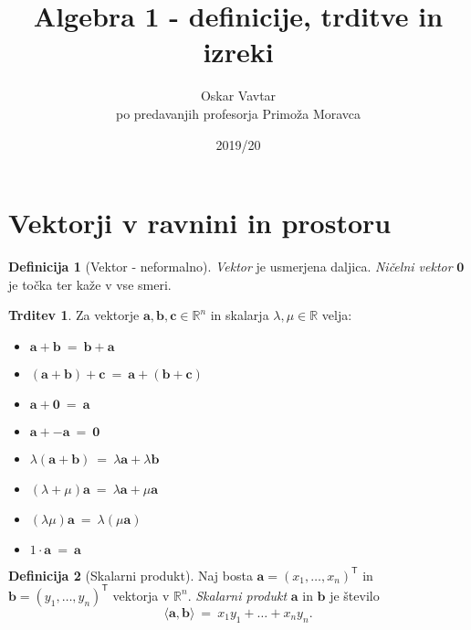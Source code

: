 \documentclass[11pt]{article}
\title{Algebra 1 - definicije, trditve in izreki}
\author{Oskar Vavtar \\
po predavanjih profesorja Primoža Moravca}
\date{2019/20}
\newcommand{\R}{\mathbb{R}}
\newcommand{\ls}{\langle}
\newcommand{\rs}{\rangle}
\renewcommand{\a}{\mathbf{a}}
\renewcommand{\b}{\mathbf{b}}
\renewcommand{\c}{\mathbf{c}}
\newcommand{\0}{\mathbf{0}}
\newcommand{\T}{\mathsf{T}}
\theoremstyle{definition}
\newtheorem{definicija}{Definicija}[section]
\theoremstyle{definition}
\newtheorem{trditev}{Trditev}[section]
\theoremstyle{definition}
\theoremstyle{definition}
\begin{document}
\maketitle
\pagebreak
\tableofcontents
\pagebreak


\section{Vektorji v ravnini in prostoru}
\vspace{0.5cm}

\begin{definicija}[Vektor - neformalno]

\textit{Vektor} je usmerjena daljica. \textit{Ničelni vektor} $\0$ je točka ter kaže v vse smeri. \\

\end{definicija}
\vspace{0.5cm}

\begin{trditev}

\noindent Za vektorje $\a,\b,\c \in \R^n$ in skalarja $\lambda,\mu \in \R$ velja:
\begin{itemize}
	\item $\a + \b ~=~ \b + \a$
	\item $(\a + \b) + \c ~=~ \a + (\b + \c) $
	\item $\a + \0 ~=~ \a$
	\item $\a + -\a ~=~ \0$
	\item $\lambda(\a + \b) ~=~ \lambda\a + \lambda\b$
	\item $(\lambda + \mu)\a ~=~ \lambda\a + \mu\a$
	\item $(\lambda\mu)\a ~=~ \lambda(\mu\a)$
	\item $1 \cdot \a ~=~ \a$
\end{itemize}

\end{trditev}

\begin{definicija}[Skalarni produkt]

Naj bosta $\a = (x_1, \ldots, x_n)^\T$ in \\$\b = (y_1, \ldots, y_n)^\T$ vektorja v $\R^n$. \textit{Skalarni produkt} $\a$ in $\b$ je število
$$\ls \a, \b \rs ~=~ x_1 y_1 +  \ldots + x_n y_n.$$

\end{definicija}
\vspace{0.5cm}
\end{document}
